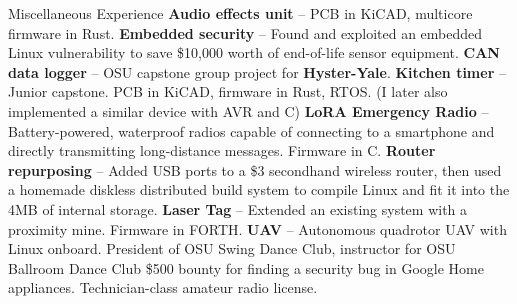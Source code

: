 \begin{rubric}{Miscellaneous Experience}
%
  \entry*[2023] \textbf{Audio effects unit} -- PCB in KiCAD, multicore firmware in Rust.
%
  \entry*[2023] \textbf{Embedded security} -- Found and exploited an embedded Linux vulnerability to save \$10,000 worth of end-of-life sensor equipment.
%
  \entry*[2022] \textbf{CAN data logger} -- OSU capstone group project for \textbf{Hyster-Yale}.
%
  \entry*[2022] \textbf{Kitchen timer} -- Junior capstone. PCB in KiCAD, firmware in Rust, RTOS. \hfill\break (I later also implemented a similar device with AVR and C)
%
  \entry*[2022] \textbf{LoRA Emergency Radio} -- Battery-powered, waterproof radios capable of connecting to a smartphone and directly transmitting long-distance messages. Firmware in C.
%
  \entry*[2019] \textbf{Router repurposing} -- Added USB ports to a \$3 secondhand wireless router, then used a homemade diskless distributed build system to compile Linux and fit it into the 4MB of internal storage.
%
  \entry*[$\cdots\cdot$] \textbf{Laser Tag} -- Extended an existing system with a proximity mine. Firmware in FORTH.
%
  \entry*[$\cdots\cdot$] \textbf{UAV} -- Autonomous quadrotor UAV with Linux onboard.
\entry*[2020 -- 2023] President of OSU Swing Dance Club, instructor for OSU Ballroom Dance Club
\entry*[2020] \$500 bounty for finding a security bug in Google Home appliances.
\entry*[] Technician-class amateur radio license.

\end{rubric}

